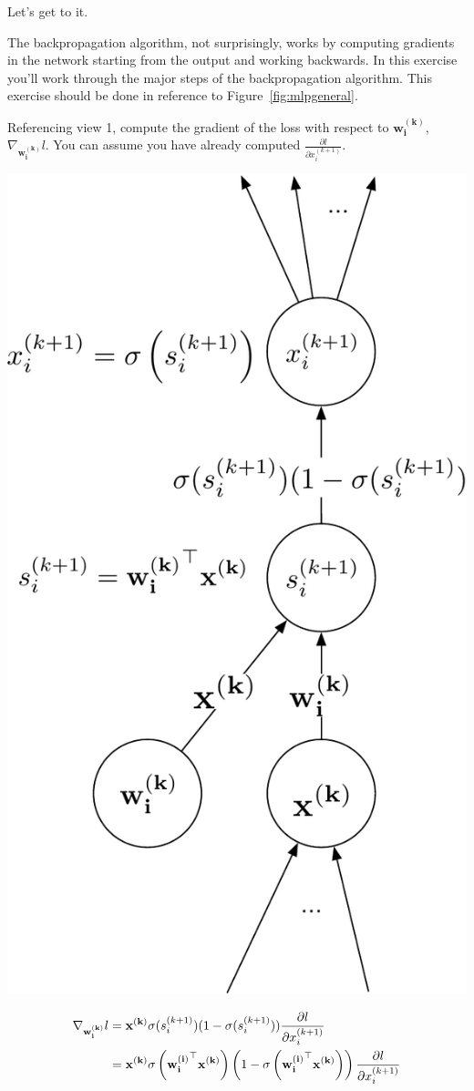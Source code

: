 \documentclass[assignment06_Solutions]{subfiles}
\begin{document}
Let's get to it.

\begin{exercise}[(75 minutes)]
The backpropagation algorithm, not surprisingly, works by computing gradients in the network starting from the output and working backwards.  In this exercise you'll work through the major steps of the backpropagation algorithm.  This exercise should be done in reference to Figure~\ref{fig:mlpgeneral}.
\bes


\item Referencing view 1, compute the gradient of the loss with respect to $\mathbf{w^{(k)}_i}$, $\nabla_{\mathbf{w^{(k)}_i}} l$.  You can assume you have already computed $\frac{\partial l}{\partial x^{(k+1)}_i}$.
\begin{boxedsolution}
\begin{center}
\includegraphics[width=0.5\linewidth]{figures/5csolution}
\end{center}
\begin{align}
\nabla_{\mathbf{w^{(k)}_i}} l &= \mathbf{x^{(k)}} \sigma(s_i^{(k+1)}) (1 - \sigma(s_i^{(k+1)}))\frac{\partial l}{\partial x_i^{(k+1)}} \\
&=  \mathbf{x^{(k)}} \sigma\left (\mathbf{w_i^{(i)}}^\top \mathbf{x^{(k)}} \right )\left (1-\sigma\left (\mathbf{w_i^{(i)}}^\top \mathbf{x^{(k)}} \right )\right) \frac{\partial l}{\partial x_i^{(k+1)}}
\end{align}
\end{boxedsolution}


\end{exercise}
\end{document}
